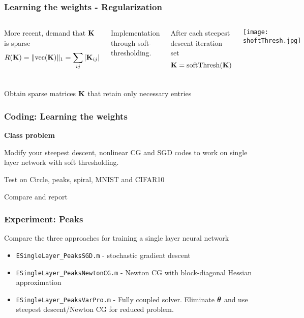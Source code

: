 \documentclass[12pt,fleqn]{beamer}
\begin{document}
\begin{frame}[fragile]\frametitle{Learning the weights - Regularization}

\begin{columns}
More recent, demand that ${\bf K}$ is sparse
$$ R({\bf K}) = \|{\rm vec}({\bf K})\|_1 = \sum_{ij} |{\bf K}_{ij}| $$

\bigskip

Implementation through soft-thresholding.


After each steepest descent iteration set
$$ {\bf K} = {\rm softThresh}({\bf K}) $$
	
	\begin{center}
	\texttt{[image: shoftThresh.jpg]}
	\end{center}
	
\end{columns}

\vspace{10mm}
\begin{center}
Obtain sparse matrices ${\bf K}$ that retain only necessary entries
	
\end{center}

\end{frame}




\begin{frame}[fragile]\frametitle{Coding: Learning the weights }

{\bf Class problem}

\bigskip

Modify your steepest descent, nonlinear CG and SGD codes to work on single layer
network with soft thresholding.

Test on Circle, peaks, spiral, MNIST and CIFAR10

Compare and report

\end{frame}
\begin{frame}\frametitle{Experiment: Peaks}
	
	Compare the three approaches for training a single layer neural network
	
	\begin{itemize}
		\item \texttt{ESingleLayer\_PeaksSGD.m} - stochastic gradient descent 
		\item \texttt{ESingleLayer\_PeaksNewtonCG.m} - Newton CG with block-diagonal Hessian approximation
		\item \texttt{ESingleLayer\_PeaksVarPro.m} - Fully coupled solver. Eliminate ${\boldsymbol \theta}$ and use steepest descent/Newton CG for reduced problem.
	\end{itemize}
	
\end{frame}
\end{document}
